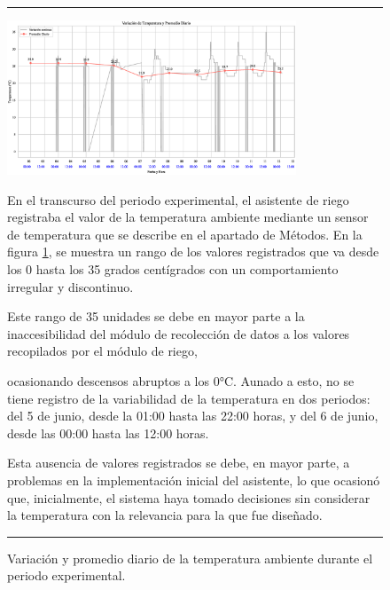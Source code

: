 \documentclass[pdflatex,sn-mathphys-num]{sn-jnl}%
\theoremstyle{thmstyleone}%
\theoremstyle{thmstyletwo}%
\theoremstyle{thmstylethree}%
\begin{document}
\begin{figure}[H]
    \hrule
    \vspace{0.2cm}
    \centering
    \includegraphics[width=0.77\textwidth]{assets/temperatura_continua_y_promedio.eps}
    \caption{Variación y promedio diario de la temperatura ambiente durante el periodo experimental.}
    \label{fig:temperatura_promedio}

    \vspace{0.4cm}

    \noindent
    \begin{minipage}[t]{0.49\textwidth}
        \justifying
         En el transcurso del periodo experimental, el asistente de riego registraba el valor de la temperatura ambiente mediante un sensor de temperatura que se describe en el apartado de Métodos. En la figura \ref{fig:temperatura_promedio}, se muestra un rango de los valores registrados que va desde los 0 hasta los 35 grados centígrados con un comportamiento irregular y discontinuo.

        Este rango de 35 unidades se debe en mayor parte a la inaccesibilidad del módulo de recolección de datos a los valores recopilados por el módulo de riego,

    \end{minipage}%
    \hfill
    \begin{minipage}[t]{0.49\textwidth}
        \justifying
        \noindent ocasionando descensos abruptos a los 0°C. Aunado a esto, no se tiene registro de la variabilidad de la temperatura en dos periodos: del 5 de junio, desde la 01:00 hasta las 22:00 horas, y del 6 de junio, desde las 00:00 hasta las 12:00 horas.

        Esta ausencia de valores registrados se debe, en mayor parte, a problemas en la implementación inicial del asistente, lo que ocasionó que, inicialmente, el sistema haya tomado decisiones sin considerar la temperatura con la relevancia para la que fue diseñado.   
	\end{minipage}

    \vspace{0.5cm}
    \hrule
\end{figure}
\end{document}
